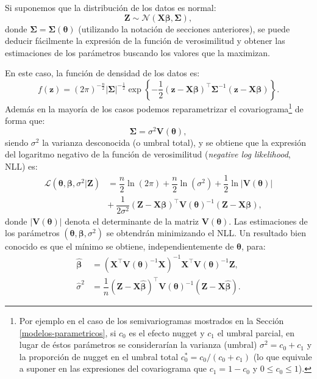 \documentclass[
  spanish,
]{book}
\theoremstyle{break}
\theoremstyle{definition}
\theoremstyle{definition}
\theoremstyle{definition}
\theoremstyle{definition}
\theoremstyle{remark}
\begin{document}
Si suponemos que la distribución de los datos es normal:
\[\mathbf{Z}\sim \mathcal{N}(\mathbf{X}\boldsymbol{\beta},\boldsymbol{\Sigma}),\]
donde \(\boldsymbol{\Sigma}=\boldsymbol{\Sigma}(\boldsymbol{\theta})\) (utilizando la notación de secciones anteriores), se puede deducir fácilmente la expresión de la función de verosimilitud y obtener las estimaciones de los parámetros buscando los valores que la maximizan.

En este caso, la función de densidad de los datos es:
\[f(\mathbf{z})=(2\pi )^{-\frac{n}{2} } \left| \boldsymbol{\Sigma} \right|^{-\frac{1}{2} }
\exp \left\{ -\dfrac{1}{2}(\mathbf{z}-\mathbf{X}\boldsymbol{\beta})^\top \boldsymbol{\Sigma}^{-1}(\mathbf{z}-\mathbf{X}\boldsymbol{\beta})\right\}.\]
Además en la mayoría de los casos podemos reparametrizar el covariograma\footnote{Por ejemplo en el caso de los semivariogramas mostrados en la Sección \ref{modelos-parametricos}, si \(c_0\) es el efecto nugget y \(c_1\) el umbral parcial, en lugar de éstos parámetros se considerarían la varianza (umbral) \(\sigma^2 =c_0 +c_1\) y la proporción de nugget en el umbral total \(c_0^{\ast} =c_0 /(c_0 +c_1)\) (lo que equivale a suponer en las expresiones del covariograma que \(c_1 = 1 - c_0\) y \(0 \leq c_0 \leq 1\)).} de forma que:
\[\boldsymbol{\Sigma}=\sigma^2 \mathbf{V}(\boldsymbol{\theta}),\]
siendo \(\sigma^2\) la varianza desconocida (o umbral total), y se obtiene que la expresión del logaritmo negativo de la función de verosimilitud (\emph{negative log likelihood}, NLL) es:
\[\begin{aligned}
\mathcal{L}(\boldsymbol{\theta},\boldsymbol{\beta},\sigma^2 \left| \mathbf{Z} \right.) & = \dfrac{n}{2} \ln (2\pi) + \dfrac{n}{2} \ln(\sigma^2) + \dfrac{1}{2} \ln \left| \mathbf{V}(\boldsymbol{\theta}) \right|  \\
& + \ \dfrac{1}{2\sigma^2 }(\mathbf{Z}-\mathbf{X}\boldsymbol{\beta})^\top \mathbf{V}(\boldsymbol{\theta})^{-1}(\mathbf{Z}-\mathbf{X}\boldsymbol{\beta}),
\end{aligned}\]
donde \(\left| \mathbf{V}(\boldsymbol{\theta})\right|\) denota el determinante de la matriz \(\mathbf{V}(\boldsymbol{\theta})\).
Las estimaciones de los parámetros \((\boldsymbol{\theta}, \boldsymbol{\beta}, \sigma^2)\) se obtendrán minimizando el NLL.
Un resultado bien conocido es que el mínimo se obtiene, independientemente de \(\boldsymbol{\theta}\), para:
\begin{equation} 
  \begin{aligned}
  \hat{\boldsymbol{\beta}} & =(\mathbf{X}^\top\mathbf{V}(\boldsymbol{\theta})^{-1} \mathbf{X})^{-1} \mathbf{X}^\top\mathbf{V}(\boldsymbol{\theta})^{-1} \mathbf{Z}, \\
  \hat{\sigma }^2 & =\dfrac{1}{n}(\mathbf{Z}-\mathbf{X}\hat{\boldsymbol{\beta}})^\top
  \mathbf{V}(\boldsymbol{\theta})^{-1}(\mathbf{Z}-\mathbf{X}\hat{\boldsymbol{\beta}}).
  \end{aligned}
  \label{eq:estimadores-ml}
\end{equation}
\end{document}

